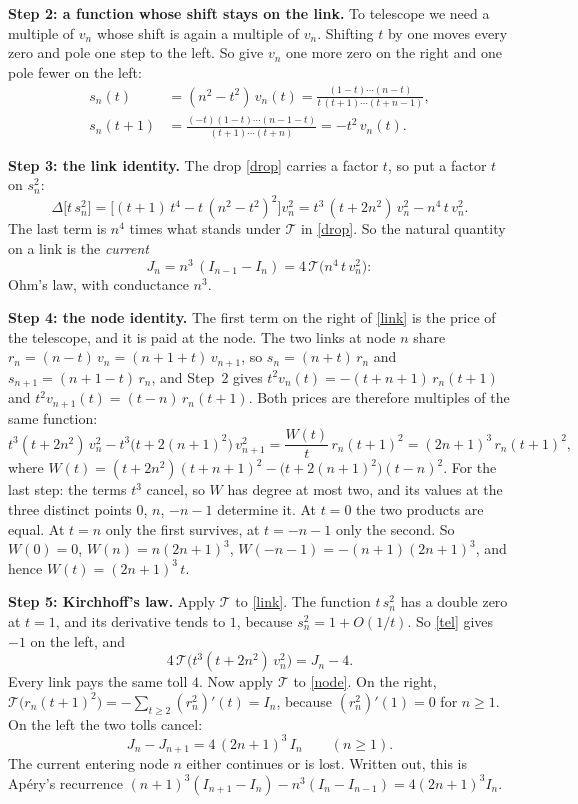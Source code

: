 \documentclass[11pt]{article}
\newcommand{\T}{\mathcal T}
\newcommand{\q}[1]{\medskip\noindent\textbf{#1}}
\begin{document}
\q{Step 2: a function whose shift stays on the link.} To telescope we need a multiple of $v_n$ whose
shift is again a multiple of $v_n$. Shifting $t$ by one moves every zero and pole one step to the
left. So give $v_n$ one more zero on the right and one pole fewer on the left:
\begin{align*}
s_n(t)&=(n^2-t^2)\,v_n(t)=\frac{(1-t)\cdots(n-t)}{t\,(t+1)\cdots(t+n-1)},\\
s_n(t+1)&=\frac{(-t)(1-t)\cdots(n-1-t)}{(t+1)\cdots(t+n)}=-t^2\,v_n(t).
\end{align*}

\q{Step 3: the link identity.} The drop \eqref{drop} carries a factor $t$, so put a factor $t$ on
$s_n^2$:
\begin{equation}\label{link}
\Delta\bigl[t\,s_n^2\bigr]=\bigl[(t+1)\,t^4-t\,(n^2-t^2)^2\bigr]v_n^2=t^3\,(t+2n^2)\,v_n^2-n^4\,t\,v_n^2 .
\end{equation}
The last term is $n^4$ times what stands under $\T$ in \eqref{drop}. So the natural quantity on a
link is the \emph{current}
\[
J_n=n^3\,(I_{n-1}-I_n)=4\,\T\bigl(n^4\,t\,v_n^2\bigr):
\]
Ohm's law, with conductance $n^3$.

\q{Step 4: the node identity.} The first term on the right of \eqref{link} is the price of the
telescope, and it is paid at the node. The two links at node $n$ share $r_n=(n-t)\,v_n=(n+1+t)\,v_{n+1}$,
so $s_n=(n+t)\,r_n$ and $s_{n+1}=(n+1-t)\,r_n$, and Step~2 gives
$t^2v_n(t)=-(t+n+1)\,r_n(t+1)$ and $t^2v_{n+1}(t)=(t-n)\,r_n(t+1)$. Both prices are therefore
multiples of the same function:
\begin{equation}\label{node}
t^3(t+2n^2)\,v_n^2-t^3\bigl(t+2(n+1)^2\bigr)\,v_{n+1}^2=\frac{W(t)}t\,r_n(t+1)^2=(2n+1)^3\,r_n(t+1)^2 ,
\end{equation}
where $W(t)=(t+2n^2)(t+n+1)^2-\bigl(t+2(n+1)^2\bigr)(t-n)^2$. For the last step: the terms $t^3$
cancel, so $W$ has degree at most two, and its values at the three distinct points $0$, $n$,
$-n-1$ determine it. At $t=0$ the two products are equal. At $t=n$ only the first survives, at
$t=-n-1$ only the second. So $W(0)=0$, $W(n)=n(2n+1)^3$, $W(-n-1)=-(n+1)(2n+1)^3$, and hence
$W(t)=(2n+1)^3\,t$.

\q{Step 5: Kirchhoff's law.} Apply $\T$ to \eqref{link}. The function $t\,s_n^2$ has a double zero
at $t=1$, and its derivative tends to $1$, because $s_n^2=1+O(1/t)$. So \eqref{tel} gives $-1$ on
the left, and
\[
4\,\T\bigl(t^3(t+2n^2)\,v_n^2\bigr)=J_n-4 .
\]
Every link pays the same toll $4$. Now apply $\T$ to \eqref{node}. On the right,
$\T\bigl(r_n(t+1)^2\bigr)=-\sum_{t\ge2}(r_n^2)'(t)=I_n$, because $(r_n^2)'(1)=0$ for $n\ge1$. On the
left the two tolls cancel:
\begin{equation}\label{K}
\boxed{\;J_n-J_{n+1}=4\,(2n+1)^3\,I_n\qquad(n\ge1).\;}
\end{equation}
The current entering node $n$ either continues or is lost. Written out, this is Ap\'ery's recurrence
$(n+1)^3(I_{n+1}-I_n)-n^3(I_n-I_{n-1})=4(2n+1)^3I_n$.
\end{document}
